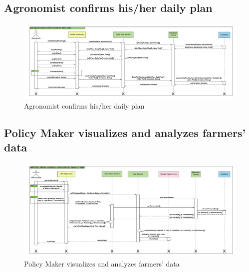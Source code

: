 \subsection{Agronomist confirms his/her daily plan}

\newpage
\begin{landscape}
\begin{figure}[h]
\vspace*{-2cm}
\noindent
\centering
\centerline{\includegraphics[scale= 0.108]{./Images/Sequence diagram/Agronomist confirms his_her daily plan.png}}
    \caption{Agronomist confirms his/her daily plan}
    \vspace*{-12cm}
\end{figure}
\fillandplacepagenumber
\end{landscape}

\subsection{Policy Maker visualizes and analyzes farmers' data}

\newpage
\begin{landscape}
\begin{figure}[h]
\vspace*{-2cm}
\noindent
\centering
\centerline{\includegraphics[scale= 0.108]{./Images/Sequence diagram/Policy Maker visualizes and analyzes farmers' data.png}}
    \caption{Policy Maker visualizes and analyzes farmers' data}
    \vspace*{-12cm}
\end{figure}
\fillandplacepagenumber
\end{landscape}

















